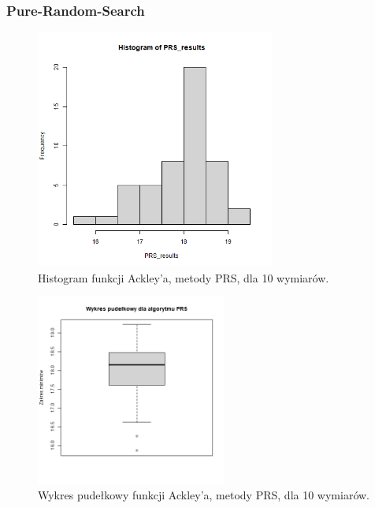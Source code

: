 \documentclass{lab}
\begin{document}
\subsubsection{Pure-Random-Search}
\begin{figure}[H]
  \centering
  \includegraphics[width=0.7\textwidth]{img/dim10_PRS_Ackley_his.png}
  \caption{Histogram funkcji Ackley'a, metody PRS, dla 10 wymiarów.}
\end{figure}
\begin{figure}[H]
  \centering
  \includegraphics[width=0.56\textwidth]{img/dim10_PRS_Ackley.png}
  \caption{Wykres pudełkowy funkcji Ackley'a, metody PRS, dla 10 wymiarów.}
\end{figure}
\end{document}
